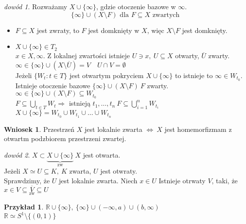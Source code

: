\documentclass[twoside,10pt]{article}
\theoremstyle{definition}
\theoremstyle{definition}
\theoremstyle{definition}
\theoremstyle{definition}
\theoremstyle{remark}
\newtheorem*{dd}{dowód}
\theoremstyle{definition}
\theoremstyle{definition}
\newtheorem*{wn}{Wniosek}
\theoremstyle{definition}
\theoremstyle{definition}
\newtheorem*{prz}{Przykład}
\theoremstyle{definition}
\theoremstyle{definition}
\begin{document}
\begin{dd} 
    Rozważamy $X \cup \{ \infty \}$, gdzie otoczenie bazowe w $\infty$.  
    \[ \{ \infty \} \cup (X \setminus F) \text{ dla } F \subseteq X \text{ zwartych }\]
    \begin{itemize} 
        \item $F \subseteq X$ jest zwraty, to $F$ jest domknięty w $X$, więc $X \setminus F$ jest domknięty. 
        \item $X \cup \{ \infty \} \in T_2$ \\ 
            $x \in X,\infty$. Z lokalnej zwartości istnieje $U \ni x,\ U \subseteq X$ 
            otwarty, $\overline U$ zwarty. \\ 
            $\infty \in \{ \infty\} \cup (X \setminus \overline U) = V \quad U \cap V = 
            \emptyset$ \\ 
            Jeżeli $\{ W_t: t \in T\}$ jest otwartym pokryciem $X \cup \{ \infty \}$ to 
            istnieje to $\infty \in W_{t_0}$. Istnieje otoczenie bazowe $\{ \infty \} 
            \cup (X \setminus F) \ F$ zwarty. \\ 
            $\infty \in \{ \infty \} \cup (X \setminus F) \subseteq W_{t_0}$ \\ 
            $F \subseteq \bigcup\limits_{t \in T} W_t \Rightarrow$ istnieją $t_1,\ldots,
            t_n \ F \subseteq \bigcup\limits_{i = 1}^n W_{t_i}$ \\ 
            $X \cup \{ \infty \} = W_{t_0} \cup W_{t_1} \cup \ldots \cup W_{t_n}$ 
    \end{itemize} 
\end{dd} 
\begin{wn} 
    Przestrzeń $X$ jest lokalnie zwarta $\Leftrightarrow \ X$ jest homemorfizmam z
    otwartm podzbiorem przestrzeni zwartej. 
\end{wn} 
\begin{dd} 
    $X \subset \underbrace{X \cup \{\infty\}}_{\text{zw}} \ X$ jest otwarta. \\ 
    Jeżeli $X \simeq U \subseteq K,\ K$ zwarta, $U$ jest otwraty. \\ 
    Sprawdzimy, że $U$ jest lokalnie zwarta. Niech $x \in U$ Istnieje otrwaty $V$, taki, 
    że $x \in V \subseteq \underset{\text{zw}}{\overline V} \subseteq U$
\end{dd} 
\begin{prz} 
    $\mathbb{R} \cup \{ \infty \},\ \{ \infty \} \cup (-\infty, a) \cup (b,\infty)$ \\ 
    $\mathbb{R} \simeq S^1 \setminus \{(0,1)\}$  
\end{prz} 
\end{document}
